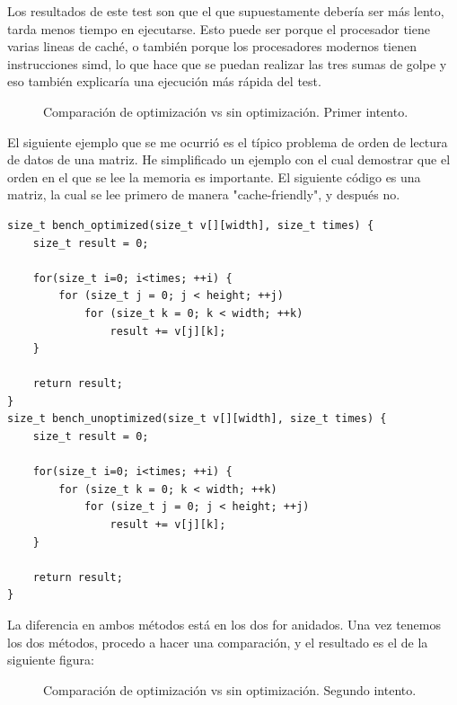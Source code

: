 Los resultados de este test son que el que supuestamente debería ser más lento, tarda menos tiempo en ejecutarse. Esto puede ser porque el procesador tiene varias lineas de caché, o también porque los procesadores modernos tienen instrucciones \gls{simd}, lo que hace que se puedan realizar las tres sumas de golpe y eso también explicaría una ejecución más rápida del test.
\begin{figure}[H]
	\centering
	\caption{Comparación de optimización vs sin optimización. Primer intento.}
\end{figure}

El siguiente ejemplo que se me ocurrió es el típico problema de orden de lectura de datos de una matriz. He simplificado un ejemplo con el cual demostrar que el orden en el que se lee la memoria es importante. El siguiente código es una matriz, la cual se lee primero de manera "cache-friendly", y después no.
\begin{lstlisting}[style=C-color, caption={Caché optimizada vs sin optimizar. Segundo intento},label=cache-optimization]
size_t bench_optimized(size_t v[][width], size_t times) {
	size_t result = 0;
	
	for(size_t i=0; i<times; ++i) {
		for (size_t j = 0; j < height; ++j) 
			for (size_t k = 0; k < width; ++k)
				result += v[j][k];
	}
	
	return result;
}
size_t bench_unoptimized(size_t v[][width], size_t times) {
	size_t result = 0;
	
	for(size_t i=0; i<times; ++i) {
		for (size_t k = 0; k < width; ++k) 
			for (size_t j = 0; j < height; ++j) 
				result += v[j][k];
	}
	
	return result;
}
\end{lstlisting}

La diferencia en ambos métodos está en los dos for anidados. Una vez tenemos los dos métodos, procedo a hacer una comparación, y el resultado es el de la siguiente figura:
\begin{figure}[H]
	\centering
	\caption{Comparación de optimización vs sin optimización. Segundo intento.}
\end{figure}


